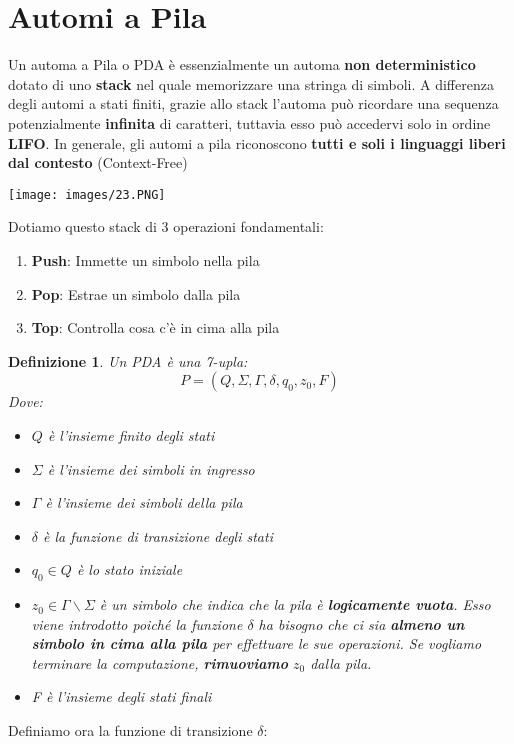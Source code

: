 \documentclass[12pt]{article}
\newtheorem{Definizione}{Definizione}[subsection]
\begin{document}
\section{Automi a Pila}
Un automa a Pila o PDA è essenzialmente un automa \textbf{non deterministico} dotato di uno \textbf{stack} nel quale memorizzare una stringa di simboli. A differenza degli automi a stati finiti, grazie allo stack l'automa può ricordare una sequenza potenzialmente \textbf{infinita} di caratteri, tuttavia esso può accedervi solo in ordine \textbf{LIFO}. In generale, gli automi a pila riconoscono \textbf{tutti e soli i linguaggi liberi dal contesto} (Context-Free) 
\begin{center}
    \texttt{[image: images/23.PNG]}
\end{center}
Dotiamo questo stack di 3 operazioni fondamentali:
\begin{enumerate}
    \item \textbf{Push}: Immette un simbolo nella pila
    \item \textbf{Pop}: Estrae un simbolo dalla pila
    \item \textbf{Top}: Controlla cosa c'è in cima alla pila
\end{enumerate}
\newpage
\begin{Definizione}
    Un PDA è una 7-upla:
    $$P = (Q, \Sigma, \Gamma, \delta, q_0, z_0, F)$$
    Dove:
    \begin{itemize}
        \item $Q$ è l'insieme finito degli stati
        \item $\Sigma$ è l'insieme dei simboli in ingresso
        \item $\Gamma$ è l'insieme dei simboli della pila
        \item $\delta$ è la funzione di transizione degli stati
        \item $q_0 \in Q$ è lo stato iniziale
        \item $z_0 \in \Gamma \backslash \Sigma$ è un simbolo che indica che la pila è \textbf{logicamente vuota}. Esso viene introdotto poiché la funzione $\delta$ ha bisogno che ci sia \textbf{almeno un simbolo in cima alla pila} per effettuare le sue operazioni. Se vogliamo terminare la computazione, \textbf{rimuoviamo} $z_0$ dalla pila.
        \item F è l'insieme degli stati finali
    \end{itemize}
\end{Definizione}
Definiamo ora la funzione di transizione $\delta$:
\end{document}
